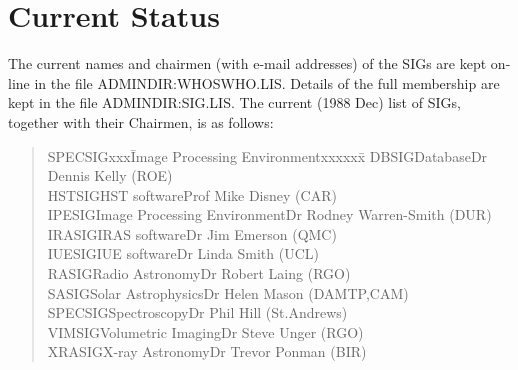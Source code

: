 \section{Current Status}

The current names and chairmen (with e-mail addresses) of the SIGs are
kept on-line in the file ADMINDIR:WHOSWHO.LIS.
Details of the full membership are kept in the file ADMINDIR:SIG.LIS.
The current (1988 Dec) list of SIGs, together with their Chairmen, is as
follows:
\begin{quote}
\begin{tabbing}
SPECSIGxxx\=Image Processing Environmentxxxxxx\=\kill
DBSIG\>Database\>Dr Dennis Kelly (ROE)\\
HSTSIG\>HST software\>Prof Mike Disney (CAR)\\
IPESIG\>Image Processing Environment\>Dr Rodney Warren-Smith (DUR)\\
IRASIG\>IRAS software\>Dr Jim Emerson (QMC)\\
IUESIG\>IUE software\>Dr Linda Smith (UCL)\\
RASIG\>Radio Astronomy\>Dr Robert Laing (RGO)\\
SASIG\>Solar Astrophysics\>Dr Helen Mason (DAMTP,CAM)\\
SPECSIG\>Spectroscopy\>Dr Phil Hill (St.Andrews)\\
VIMSIG\>Volumetric Imaging\>Dr Steve Unger (RGO)\\
XRASIG\>X-ray Astronomy\>Dr Trevor Ponman (BIR)
\end{tabbing}
\end{quote}


